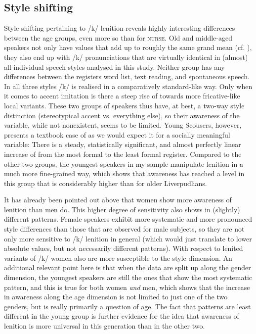 \subsection{Style shifting}
\label{prod.disc.k.style}

Style shifting pertaining to /k/ lenition reveals highly interesting differences between the age groups, even more so than for \textsc{nurse}.
Old and middle-aged speakers not only have  values that add up to roughly the same grand mean (cf. ), they also end up with /k/ pronunciations that are virtually identical in (almost) all individual speech styles analysed in this study.
Neither group has any differences between the registers word list, text reading, and spontaneous speech.
In all three styles /k/ is realised in a comparatively standard-like way.
Only when it comes to accent imitation is there a steep rise of  towards more fricative-like local variants.
These two groups of speakers thus have, at best, a two-way style distinction (stereotypical accent vs. everything else), so their awareness of the variable, while not nonexistent, seems to be limited.
Young Scousers, however, presents a textbook case of  as we would expect it for a socially meaningful variable: There is a steady, statistically significant, and almost perfectly linear increase of  from the most formal to the least formal register.
Compared to the other two groups, the youngest speakers in my sample manipulate lenition in a much more fine-grained way, which shows that awareness has reached a level in this group that is considerably higher than for older Liverpudlians.

It has already been pointed out above that women show more awareness of lenition than men do.
This higher degree of sensitivity also shows in (slightly) different  patterns.
Female speakers exhibit more systematic and more pronounced style differences than those that are observed for male subjects, so they are not only more sensitive to /k/ lenition in general (which would just translate to lower absolute  values, but not necessarily different  patterns).
With respect to lenited variants of /k/ women also are more susceptible to the style dimension.
An additional relevant point here is that when the data are split up along the gender dimension, the youngest speakers are still the ones that show the most systematic  pattern, and this is true for both women \emph{and} men, which shows that the increase in awareness along the age dimension is not limited to just one of the two genders, but is really primarily a question of age.
The fact that  patterns are least different in the young group is further evidence for the idea that awareness of lenition is more universal in this generation than in the other two.

